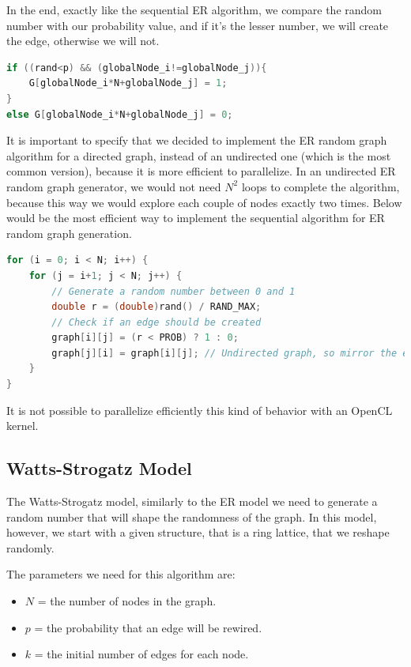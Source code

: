 \documentclass[titlepage]{article}
\begin{document}
In the end, exactly like the sequential ER algorithm, we compare the random number with our probability value, and if it's the lesser number, we will create the edge, otherwise we will not.

\begin{minipage}{\linewidth}
\begin{lstlisting}[language=C, style=customc, breaklines=true]
if ((rand<p) && (globalNode_i!=globalNode_j)){
    G[globalNode_i*N+globalNode_j] = 1;
}
else G[globalNode_i*N+globalNode_j] = 0;
\end{lstlisting}
\end{minipage}

It is important to specify that we decided to implement the ER random graph algorithm for a directed graph, instead of an undirected one (which is the most common version), because it is more efficient to parallelize. In an undirected ER random graph generator, we would not need $N^2$ loops to complete the algorithm, because this way we would explore each couple of nodes exactly two times. Below would be the most efficient way to implement the sequential algorithm for ER random graph generation.

\begin{minipage}{\linewidth}
\begin{lstlisting}[language=C, style=customc, breaklines=true]
for (i = 0; i < N; i++) {
    for (j = i+1; j < N; j++) {
        // Generate a random number between 0 and 1
        double r = (double)rand() / RAND_MAX;
        // Check if an edge should be created
        graph[i][j] = (r < PROB) ? 1 : 0;
        graph[j][i] = graph[i][j]; // Undirected graph, so mirror the edge
    }
}
\end{lstlisting}
\end{minipage}

It is not possible to parallelize efficiently this kind of behavior with an OpenCL kernel.

\subsection{Watts-Strogatz Model}
The Watts-Strogatz model, similarly to the ER model we need to generate a random number that will shape the randomness of the graph. In this model, however, we start with a given structure, that is a ring lattice, that we reshape randomly.

The parameters we need for this algorithm are:
\begin{itemize}
    \item $N$ = the number of nodes in the graph.
    \item $p$ = the probability that an edge will be rewired.
    \item $k$ = the initial number of edges for each node.
\end{itemize}
\end{document}
